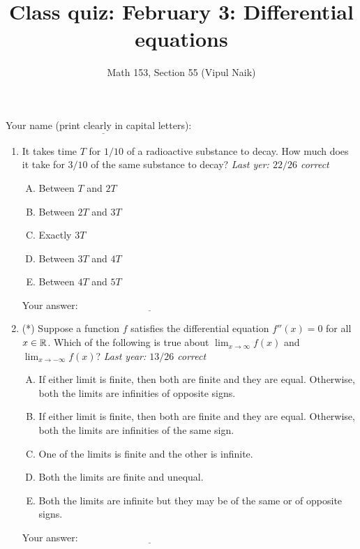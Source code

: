 \documentclass[10pt]{amsart}
\title{Class quiz: February 3: Differential equations}
\author{Math 153, Section 55 (Vipul Naik)}
\begin{document}
\maketitle

Your name (print clearly in capital letters): $\underline{\qquad\qquad\qquad\qquad\qquad\qquad\qquad\qquad\qquad\qquad}$

\begin{enumerate}
\item It takes time $T$ for $1/10$ of a radioactive substance to
  decay. How much does it take for $3/10$ of the same substance to
  decay? {\em Last yer: $22/26$ correct}
  
  \begin{enumerate}[(A)]
  \item Between $T$ and $2T$
  \item Between $2T$ and $3T$
  \item Exactly $3T$
  \item Between $3T$ and $4T$
  \item Between $4T$ and $5T$
  \end{enumerate}

  \vspace{0.1in}
  Your answer: $\underline{\qquad\qquad\qquad\qquad\qquad\qquad\qquad}$
  \vspace{0.15in}

\item (*) Suppose a function $f$ satisfies the differential equation
  $f''(x) = 0$ for all $x \in \mathbb{R}$. Which of the following is true
  about $\lim_{x \to \infty} f(x)$ and $\lim_{x \to -\infty} f(x)$?
  {\em Last year: $13/26$ correct}

  \begin{enumerate}[(A)]
  \item If either limit is finite, then both are finite and they are
    equal. Otherwise, both the limits are infinities of opposite
    signs.
  \item If either limit is finite, then both are finite and they are
    equal. Otherwise, both the limits are infinities of the same sign.
  \item One of the limits is finite and the other is infinite.
  \item Both the limits are finite and unequal.
  \item Both the limits are infinite but they may be of the same or of
    opposite signs.
  \end{enumerate}

  \vspace{0.1in}
  Your answer: $\underline{\qquad\qquad\qquad\qquad\qquad\qquad\qquad}$
  \vspace{0.15in}


\end{enumerate}
\end{document}
